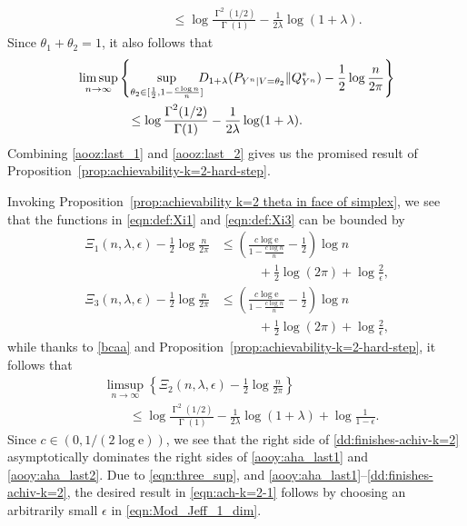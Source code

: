 \documentclass[journal, 10pt]{IEEEtran}
\newcommand{\rme}{\mathrm{e}}
\theoremstyle{plain}
\theoremstyle{plain}
\theoremstyle{plain}
\theoremstyle{plain}
\newcommand{\opGamma}{\operatorname{\Gamma}}
\begin{document}
\begin{IEEEproof}
\begin{align}
&\qquad \qquad \le \log \frac{\opGamma^2(1/2)}{\opGamma(1)}-\frac{1}{2\lambda}\log(1+\lambda)\text{.} \label{aooz:last_1}
\end{align}
Since $\theta_1+\theta_2=1$, it also follows that
\begin{align}
&\limsup_{n \to \infty} \left\{ \sup_{\theta_2 \in [ \frac{1}{2}, 1-\frac{c\log n}{n}]} \hspace{-2mm} D_{1+\lambda}(P_{Y^n|V=\theta_2}\| Q^{\ast}_{Y^n}) -\frac{1}{2}\log \frac{n}{2\pi}\right\} \nonumber \\
&\qquad \qquad \le \log \frac{\opGamma^2(1/2)}{\opGamma(1)}-\frac{1}{2\lambda}\log(1+\lambda)\text{.} \label{aooz:last_2}
\end{align}
Combining \eqref{aooz:last_1} and \eqref{aooz:last_2} gives us the promised result of Proposition~\ref{prop:achievability-k=2-hard-step}. 
\end{IEEEproof}
Invoking Proposition~\ref{prop:achievability k=2 theta in face of simplex}, we see that the functions in \eqref{eqn:def:Xi1} and \eqref{eqn:def:Xi3} can be bounded by
\begin{align}
\Xi_1(n,\lambda, \epsilon) -\frac{1}{2}\log \frac{n}{2\pi}
& \le \left(\frac{c\log \rme }{1-\frac{c\log n}{n}}-\frac{1}{2} \right)\log n  \label{aooy:aha_last1}  \\ 
&\qquad \quad +\frac{1}{2}\log ( 2\pi) + \log \frac{2}{\epsilon}\text{,} \nonumber \\
\Xi_3(n,\lambda, \epsilon) -\frac{1}{2}\log \frac{n}{2\pi} 
& \le \left(\frac{c\log\rme}{1-\frac{c\log n}{n}}-\frac{1}{2}\right)\log n\label{aooy:aha_last2} \\
&\qquad \quad +\frac{1}{2}\log(2\pi)+\log\frac{2}{\epsilon}\text{,}  \nonumber
\end{align} 
while thanks to \eqref{bcaa} and Proposition~\ref{prop:achievability-k=2-hard-step}, it follows that
\begin{align}
&\limsup_{n\to \infty} \left\{  \Xi_2(n,\lambda, \epsilon) - \frac{1}{2}\log \frac{n}{2\pi} \right\}
 \nonumber \\
&\qquad \le \log \frac{\opGamma^2(1/2)}{\opGamma(1)} -\frac{1}{2\lambda}\log(1+\lambda) +\log \frac{1}{1-\epsilon}  \text{.} \label{dd:finishes-achiv-k=2}
\end{align}
Since $c \in (0, 1/(2\log \rme))$, we see that the right side of \eqref{dd:finishes-achiv-k=2} asymptotically dominates the right sides of \eqref{aooy:aha_last1} and \eqref{aooy:aha_last2}. Due to \eqref{eqn:three_sup}, and \eqref{aooy:aha_last1}--\eqref{dd:finishes-achiv-k=2}, the desired result in \eqref{eqn:ach-k=2-1} follows by choosing an arbitrarily small $\epsilon $ in \eqref{eqn:Mod_Jeff_1_dim}.
\hfill\IEEEQED
\end{document}
